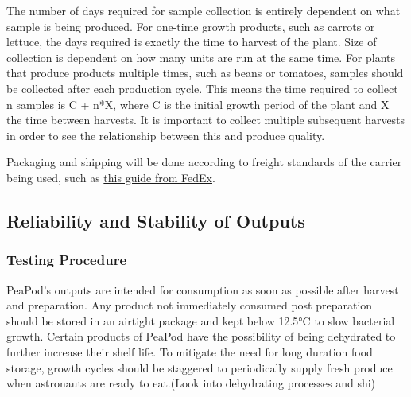 The number of days required for sample collection is entirely dependent on what sample is being produced. For one-time growth products, such as carrots or lettuce, the days required is exactly the time to harvest of the plant. Size of collection is dependent on how many units are run at the same time. For plants that produce products multiple times, such as beans or tomatoes, samples should be collected after each production cycle. This means the time required to collect n samples is C + n*X, where C is the initial growth period of the plant and X the time between harvests. It is important to collect multiple subsequent harvests in order to see the relationship between this and produce quality.

Packaging and shipping will be done according to freight standards of the carrier being used, such as \href{https://www.fedex.com/en-us/shipping/how-to-ship-perishables.html#1}{this guide from FedEx}. 



\clearpage

\subsection{Reliability and Stability of Outputs}


\subsubsection{Testing Procedure}

PeaPod's outputs are intended for consumption as soon as possible after harvest and preparation. Any product not immediately consumed post preparation should be stored in an airtight package and kept below 12.5°C to slow bacterial growth. Certain products of PeaPod have the possibility of being dehydrated to further increase their shelf life. 
To mitigate the need for long duration food storage, growth cycles should be staggered to periodically supply fresh produce when astronauts are ready to eat.(Look into dehydrating processes and shi)

